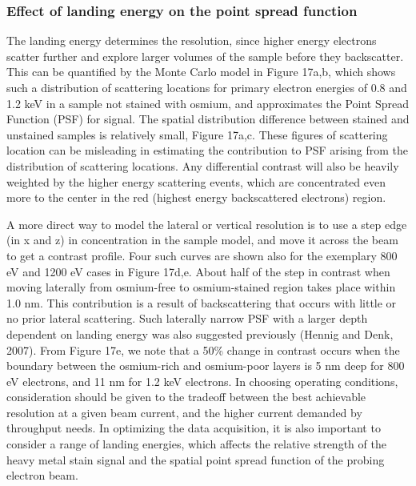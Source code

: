 \documentclass{article}
\begin{document}
\subsubsection*{Effect of landing energy on the point spread function}

The landing energy determines the resolution, since higher energy electrons scatter further and explore larger volumes of the sample before they backscatter. This can be quantified by the Monte Carlo model in Figure 17a,b, which shows such a distribution of scattering locations for primary electron energies of 0.8 and 1.2 keV in a sample not stained with osmium, and approximates the Point Spread Function (PSF) for signal. The spatial distribution difference between stained and unstained samples is relatively small, Figure 17a,c. These figures of scattering location can be misleading in estimating the contribution to PSF arising from the distribution of scattering locations. Any differential contrast will also be heavily weighted by the higher energy scattering events, which are concentrated even more to the center in the red (highest energy backscattered electrons) region.

A more direct way to model the lateral or vertical resolution is to use a step edge (in x and z) in concentration in the sample model, and move it across the beam to get a contrast profile. Four such curves are shown also for the exemplary 800 eV and 1200 eV cases in Figure 17d,e. About half of the step in contrast when moving laterally from osmium-free to osmium-stained region takes place within 1.0 nm. This contribution is a result of backscattering that occurs with little or no prior lateral scattering. Such laterally narrow PSF with a larger depth dependent on landing energy was also suggested previously (Hennig and Denk, 2007). From Figure 17e, we note that a 50\% change in contrast occurs when the boundary between the osmium-rich and osmium-poor layers is 5 nm deep for 800 eV electrons, and 11 nm for 1.2 keV electrons. In choosing operating conditions, consideration should be given to the tradeoff between the best achievable resolution at a given beam current, and the higher current demanded by throughput needs. In optimizing the data acquisition, it is also important to consider a range of landing energies, which affects the relative strength of the heavy metal stain signal and the spatial point spread function of the probing electron beam.
\end{document}
